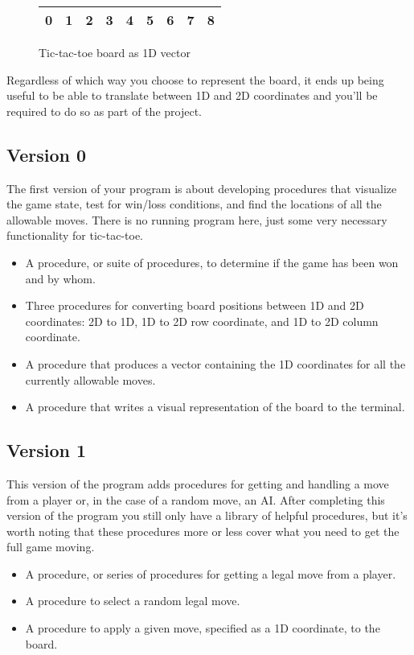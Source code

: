 \documentclass[]{tufte-handout}
\begin{document}
\begin{figure}
  \begin{tabular}{@{}|c|c|c|c|c|c|c|c|c|@{}}
    \midrule
    0 & 1 & 2 & 3 & 4 & 5 & 6 & 7 & 8 \\
    \midrule
  \end{tabular}
  \caption{Tic-tac-toe board as 1D vector}
\end{figure}

Regardless of which way you choose to represent the board, it ends up being useful
to be able to translate between 1D and 2D coordinates and you'll be required to
do so as part of the project.


\subsection{Version 0}

The first version of your program is about developing procedures that visualize
the game state, test for win/loss conditions, and find the locations of all the
allowable moves. There is no running program here, just some very necessary
functionality for tic-tac-toe.

\begin{itemize}
  \item A procedure, or suite of procedures, to determine if the game has been
   won and by whom.
  \item Three procedures for converting board positions between 1D and 2D
    coordinates: 2D to 1D, 1D to 2D row coordinate, and 1D to 2D column coordinate.
  \item A procedure that produces a vector containing the 1D coordinates for
  all the currently allowable moves.
  \item A procedure that writes a visual representation of the board to the
  terminal.
\end{itemize}


\subsection{Version 1}

This version of the program adds procedures for getting and handling a move from
a player or, in the case of a random move, an AI.  After completing this version
of the program you still only have a library of helpful procedures, but it's
worth noting that these procedures more or less cover what you need to get the
full game moving.

\begin{itemize}
  \item A procedure, or series of procedures for getting a legal move from a
  player.
  \item A procedure to select a random legal move.
  \item A procedure to apply a given move, specified as a 1D coordinate, to
  the board.
\end{itemize}
\end{document}
